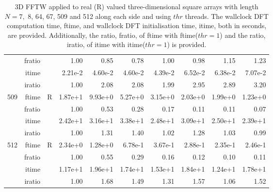 \documentclass[a4paper]{article}
\begin{document}
\begin{table}[!htbp]
\begin{center}
\begin{small}
\begin{tabular}{|r|r|r|r|r|r|r|r|r|r|}
      & fratio & &     1.00 &   0.85 &   0.78 &   1.00 &   0.98 &   1.15 &   1.23        \\ 
     & itime & &       2.21e-2 &   4.60e-2 &   4.60e-2 &   4.39e-2 &   6.52e-2 &   6.38e-2 &   7.07e-2        \\ 
     & iratio & &      1.00 &   2.08 &   2.08 &   1.99 &   2.95 &   2.89 &   3.20      \\ \hline 
  509  & ftime & R  &  1.87e+1 &   9.93e+0 &   5.27e+0 &   3.15e+0 &   2.03e+0 &   1.99e+0 &   1.23e+0    \\ 
      & fratio & &     1.00 &   0.53 &   0.28 &   0.17 &   0.11 &   0.11 &   0.07        \\ 
     & itime & &       2.42e+1 &   3.16e+1 &   3.38e+1 &   2.48e+1 &   3.09e+1 &   2.50e+1 &   2.39e+1       \\ 
     & iratio & &      1.00 &   1.31 &   1.40 &   1.02 &   1.28 &   1.03 &   0.99         \\ \hline 
  512  & ftime & R  &  2.34e+0 &   1.28e+0 &   6.78e-1 &   3.67e-1 &   2.88e-1 &   2.35e-1 &   2.46e-1     \\ 
      & fratio & &     1.00 &   0.55 &   0.29 &   0.16 &   0.12 &   0.10 &   0.11     \\ 
     & itime & &       1.17e+1 &   1.96e+1 &   1.74e+1 &   1.53e+1 &   1.84e+1 &   1.24e+1 &   1.78e+1        \\ 
     & iratio & &      1.00 &   1.68 &   1.49 &   1.31 &   1.57 &   1.06 &   1.52        \\ \hline 
\end{tabular}
\caption{3D FFTW applied to real (R) valued three-dimensional square arrays with length
  $N=7,$ 8, 64, 67, 509 and 512 along each side and using $thr$ threads. The wallclock DFT computation time,
  ftime, and wallclock DFT initialisation time, itime, both in seconds, are provided. Additionally,  the ratio,
  fratio, of ftime  with ftime($thr=1$) and the ratio, iratio, of itime  with itime($thr=1$) is provided. }\label{TblFFTW3d}
\end{small}
\end{center}
\end{table}
\end{document}
